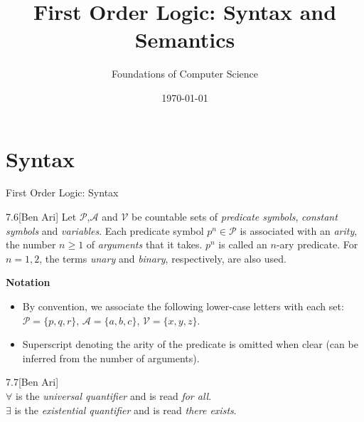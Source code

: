 \documentclass[style=sailor,size=12pt]{powerdot}
\title{First Order Logic: Syntax and Semantics}
\author{Foundations of Computer Science}
\date{\today}
\begin{document}
\maketitle
\section[slide=false]{Syntax}
\begin{slide}[bm=,toc=]{First Order Logic: Syntax}
\begin{defn}{7.6}[Ben Ari]
Let $\mathcal{P}$,$\mathcal{A}$ and $\mathcal{V}$ be countable sets of
\emph{predicate symbols}, \emph{constant symbols} and \emph{variables}.
Each predicate symbol $p^n \in \mathcal{P}$ is associated with an \emph{arity},
the number $n \geq 1$ of \emph{arguments} that it takes. $p^n$ is called an
$n$-ary predicate. For $n = 1,2$, the terms \emph{unary} and \emph{binary},
respectively, are also used.
\end{defn}
{\bf Notation}
\begin{itemize}
\item By convention, we associate the following lower-case letters with
each set: $\mathcal{P} = \{p,q,r\}$, $\mathcal{A} = \{a,b,c\}$, $\mathcal{V} =
\{x,y,z\}$.
\item Superscript denoting the arity of the predicate is omitted when clear (can
    be inferred from the number of arguments).

\end{itemize}
\begin{defn}{7.7}[Ben Ari]
~\\
$\forall$ is the \emph{universal quantifier} and is read \emph{for all}.\\
$\exists$ is the \emph{existential quantifier} and is read \emph{there exists}.
\end{defn}

\end{slide}
\end{document}
